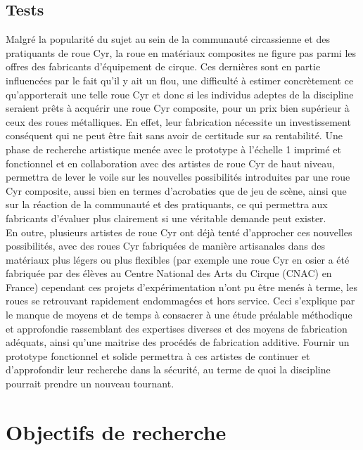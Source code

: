 \subsection{Tests}
Malgré la popularité du sujet au sein de la communauté circassienne et des pratiquants de roue Cyr, la roue en matériaux composites ne figure pas parmi les offres des fabricants d’équipement de cirque. Ces dernières sont en partie influencées par le fait qu’il y ait un flou, une difficulté à estimer concrètement ce qu’apporterait une telle roue Cyr et donc si les individus adeptes de la discipline seraient prêts à acquérir une roue Cyr composite, pour un prix bien supérieur à ceux des roues métalliques. En effet, leur fabrication nécessite un investissement conséquent qui ne peut être fait sans avoir de certitude sur sa rentabilité. Une phase de recherche artistique menée avec le prototype à l’échelle 1 imprimé et fonctionnel et en collaboration avec des artistes de roue Cyr de haut niveau, permettra de lever le voile sur les nouvelles possibilités introduites par une roue Cyr composite, aussi bien en termes d'acrobaties que de jeu de scène, ainsi que sur la réaction de la communauté et des pratiquants, ce qui permettra aux fabricants d'évaluer plus clairement si une véritable demande peut exister.\\
En outre, plusieurs artistes de roue Cyr ont déjà tenté d'approcher ces nouvelles possibilités, avec des roues Cyr fabriquées de manière artisanales dans des matériaux plus légers ou plus flexibles (par exemple une roue Cyr en osier a été fabriquée par des élèves au Centre National des Arts du Cirque (CNAC) en France)
cependant ces projets d'expérimentation n'ont pu être menés à terme, les roues se retrouvant rapidement endommagées et hors service. Ceci s'explique par le manque de moyens et de temps à consacrer à une étude préalable méthodique et approfondie rassemblant des expertises diverses et des moyens de fabrication adéquats, ainsi qu'une maitrise des procédés de fabrication additive. Fournir un prototype fonctionnel et solide permettra à ces artistes de continuer et d'approfondir leur recherche dans la sécurité, au terme de quoi la discipline pourrait prendre un nouveau tournant.\\


\FloatBarrier


\section{Objectifs de recherche}  %
